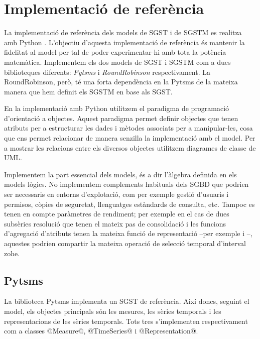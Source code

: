 

\chapter{Implementació de referència}
\label{sec:implementacio:python}


La implementació de referència dels models de \gls{SGST} i de \gls{SGSTM}
es realitza amb Python \parencite{python:doc2}. L'objectiu d'aquesta
implementació de referència és mantenir la fidelitat al model per tal
de poder experimentar-hi amb tota la potència matemàtica.
Implementem els dos models de \gls{SGST} i \gls{SGSTM} com a dues biblioteques
diferents: \emph{Pytsms} i \emph{RoundRobinson} respectivament. La
RoundRobinson, però, té una forta dependència en la
Pytsms de la mateixa manera que hem definit els \gls{SGSTM} en base
als \gls{SGST}.


En la implementació amb Python utilitzem el paradigma de programació
d'orientació a objectes. Aquest paradigma permet definir objectes que
tenen atributs per a estructurar les dades i mètodes associats per a
manipular-les, cosa que ens permet relacionar de manera senzilla la
implementació amb el model.  Per a mostrar les relacions entre els
diversos objectes utilitzem diagrames de classe de \gls{UML}.




Implementem la part essencial dels models, és a dir l'àlgebra definida
en els models lògics. No implementem complements habituals dels
\gls{SGBD} que podrien ser necessaris en entorns d'explotació, com per
exemple gestió d'usuaris i permisos, còpies de seguretat, llenguatges
estàndards de consulta, etc.  Tampoc es tenen en compte paràmetres de
rendiment; per exemple en el cas de dues subsèries resolució que tenen
el mateix pas de consolidació i les funcions d'agregació d'atributs
tenen la mateixa funció de representació --per exemple
 i --,
aquestes podrien compartir la mateixa operació de
selecció temporal d'interval \gls{zohe}.



\section{Pytsms}

La biblioteca Pytsms implementa un \gls{SGST} de referència. Així
doncs, seguint el model, els objectes principals són les mesures, les
sèries temporals i les representacions de les sèries temporals. Tots
tres s'implementen respectivament com a classes @Measure@,
@TimeSeries@ i @Representation@.



